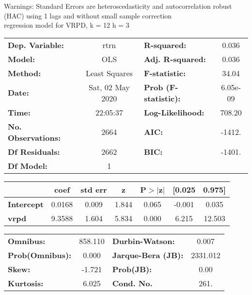 Warnings: \newline
 [1] Standard Errors are heteroscedasticity and autocorrelation robust (HAC) using 1 lags and without small sample correction\\ 

regression model for VRPD, k = 12 h = 3\begin{center}
\begin{tabular}{lclc}
\toprule
\textbf{Dep. Variable:}    &       rtrn       & \textbf{  R-squared:         } &     0.036   \\
\textbf{Model:}            &       OLS        & \textbf{  Adj. R-squared:    } &     0.036   \\
\textbf{Method:}           &  Least Squares   & \textbf{  F-statistic:       } &     34.04   \\
\textbf{Date:}             & Sat, 02 May 2020 & \textbf{  Prob (F-statistic):} &  6.05e-09   \\
\textbf{Time:}             &     22:05:37     & \textbf{  Log-Likelihood:    } &    708.20   \\
\textbf{No. Observations:} &        2664      & \textbf{  AIC:               } &    -1412.   \\
\textbf{Df Residuals:}     &        2662      & \textbf{  BIC:               } &    -1401.   \\
\textbf{Df Model:}         &           1      & \textbf{                     } &             \\
\bottomrule
\end{tabular}
\begin{tabular}{lcccccc}
                   & \textbf{coef} & \textbf{std err} & \textbf{z} & \textbf{P$> |$z$|$} & \textbf{[0.025} & \textbf{0.975]}  \\
\midrule
\textbf{Intercept} &       0.0168  &        0.009     &     1.844  &         0.065        &       -0.001    &        0.035     \\
\textbf{vrpd}      &       9.3588  &        1.604     &     5.834  &         0.000        &        6.215    &       12.503     \\
\bottomrule
\end{tabular}
\begin{tabular}{lclc}
\textbf{Omnibus:}       & 858.110 & \textbf{  Durbin-Watson:     } &    0.007  \\
\textbf{Prob(Omnibus):} &   0.000 & \textbf{  Jarque-Bera (JB):  } & 2331.012  \\
\textbf{Skew:}          &  -1.721 & \textbf{  Prob(JB):          } &     0.00  \\
\textbf{Kurtosis:}      &   6.025 & \textbf{  Cond. No.          } &     261.  \\
\bottomrule
\end{tabular}
\end{center}

